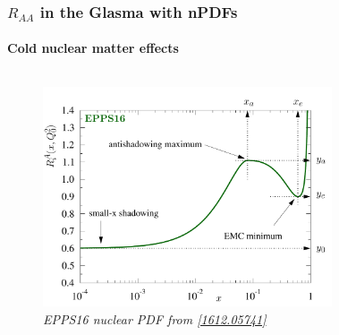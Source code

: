 \documentclass[aspectratio=169,11pt,usenames,dvipsnames]{beamer}
\begin{document}
\begin{frame}
    \frametitle{$R_{AA}$ in the Glasma with nPDFs}
    \framesubtitle{Cold nuclear matter effects}
    \vspace{-15pt}
    \begin{center}
        \begin{columns}[onlytextwidth,t]
           \begin{figure}
                \centering
                \vspace{5pt}
                \includegraphics[width=\columnwidth]{images/FitForm_EPPS16.pdf}
                \captionsetup{justification=centering}
                \caption{\scriptsize\itshape EPPS16 nuclear PDF from \href{https://arxiv.org/abs/1612.05741}{\color{ForestGreen}[1612.05741]}}
            \end{figure}
            \begin{figure}
                \centering

\end{figure}
\end{columns}
\end{center}
\end{frame}
\end{document}
